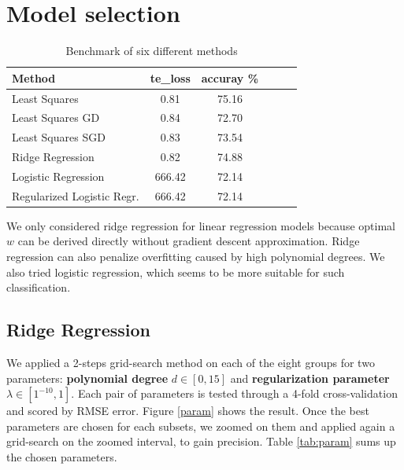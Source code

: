 \documentclass[10pt,conference,compsocconf]{IEEEtran}
\begin{document}
\section{Model selection}


\begin{table}[htbp]
  \centering
  \begin{tabular}[c]{| l | c | c | l | c | c |}
    \hline
    Method 	     & te\_loss & accuray \% \\
    \hline
    \hline 
    Least Squares 			& 0.81		& 75.16	    \\
    Least Squares GD 		& 0.84		& 72.70 	    \\
    Least Squares SGD 		& 0.83		& 73.54	    \\
    Ridge Regression 			& 0.82  		& 74.88	\\
    Logistic Regression		& 666.42  		& 72.14 	\\
    Regularized Logistic Regr.  	& 666.42  		& 72.14 	\\
\hline
  \end{tabular}
  \caption{Benchmark of six different methods}
  \label{tab:methods}
\end{table}



%










We only considered ridge regression for linear regression models because optimal $w$ can be derived directly without gradient descent approximation. Ridge regression can also penalize overfitting caused by high polynomial degrees. We also tried logistic regression, which seems to be more suitable for such classification.

\subsection{Ridge Regression}
We applied a 2-steps grid-search method on each of the eight groups for two parameters: \textbf{polynomial degree} $d \in [0, 15]$ and \textbf{regularization parameter} $\lambda \in [1^{-10}, 1]$.  Each pair of parameters is tested through a 4-fold cross-validation and scored by RMSE error. Figure \ref{param} shows the result. {\color{red}Once the best parameters are chosen for each subsets, we zoomed on them and applied again a grid-search on the zoomed interval, to gain precision}. Table \ref{tab:param} sums up the chosen parameters.
\end{document}
